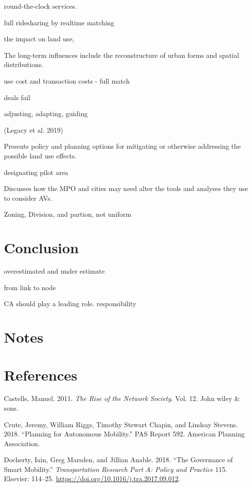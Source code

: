 \documentclass[12pt,]{article}
\begin{document}
round-the-clock services.

full ridesharing by realtime matching

the impact on land use,

The long-term influences include the reconstructure of urban forms and
spatial distributions.

use cost and transaction costs - full match

deals fail

adjusting, adapting, guiding

(Legacy et al. 2019)

Presents policy and planning options for mitigating or otherwise
addressing the possible land use effects.

designating pilot area

Discusses how the MPO and cities may need alter the tools and analyses
they use to consider AVs.

Zoning, Division, and partion, not uniform

\hypertarget{conclusion}{%
\section{Conclusion}\label{conclusion}}

overestimated and under estimate

from link to node

CA should play a leading role. responsibility

\hypertarget{notes}{%
\section{Notes}\label{notes}}

\hypertarget{references}{%
\section*{References}\label{references}}

\hypertarget{refs}{}
\leavevmode\hypertarget{ref-castells2011rise}{}%
Castells, Manuel. 2011. \emph{The Rise of the Network Society}. Vol. 12.
John wiley \& sons.

\leavevmode\hypertarget{ref-APA2018autonomous}{}%
Crute, Jeremy, William Riggs, Timothy Stewart Chapin, and Lindsay
Stevens. 2018. ``Planning for Autonomous Mobility.'' PAS Report 592.
American Planning Association.

\leavevmode\hypertarget{ref-docherty2018governance}{}%
Docherty, Iain, Greg Marsden, and Jillian Anable. 2018. ``The Governance
of Smart Mobility.'' \emph{Transportation Research Part A: Policy and
Practice} 115. Elsevier: 114--25.
\url{https://doi.org/10.1016/j.tra.2017.09.012}.
\end{document}
